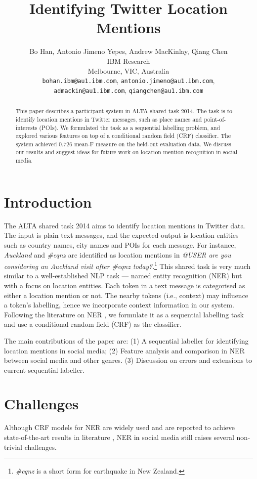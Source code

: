 \documentclass[11pt]{article}
\title{Identifying Twitter Location Mentions}
\author{Bo Han, Antonio Jimeno Yepes, Andrew MacKinlay, Qiang Chen \\
  IBM Research \\
  Melbourne, VIC, Australia \\
  {\tt bohan.ibm@au1.ibm.com}, {\tt antonio.jimeno@au1.ibm.com}, \\
  {\tt admackin@au1.ibm.com}, {\tt qiangchen@au1.ibm.com} 
  \\}
\date{}
\newcommand{\ie}{i.e.,\xspace}
\newcommand{\myex}[1]{\textit{#1}}
\begin{document}
\maketitle
\begin{abstract}
    This paper describes a participant system in ALTA shared task 2014.
    The task is to identify location mentions in Twitter messages, such as place names and point-of-interests (POIs).
    We formulated the task as a sequential labelling problem, and explored various features on top of a conditional random field (CRF) classifier.
    The system achieved 0.726 mean-F measure on the held-out evaluation data.
    We discuss our results and suggest ideas for future work on location mention recognition in social media.
\end{abstract}

\section{Introduction}
\label{sec:intro}
The ALTA shared task 2014 aims to identify location mentions in Twitter data.
The input is plain text messages, and the expected output is location entities such as country names, city names and POIs for each message.
For instance, \myex{Auckland} and \myex{\#eqnz} are identified as location mentions in \myex{@USER are you considering an Auckland visit after \#eqnz today?}.\footnote{\myex{\#eqnz} is a short form for earthquake in New Zealand.}
This shared task is very much similar to a well-established NLP task --- named entity recognition (NER) but with a focus on location entities.
Each token in a text message is categorised as either a location mention or not.
The nearby tokens (\ie context) may influence a token's labelling, hence we incorporate context information in our system.
Following the literature on NER \cite{wwwc13ling}, we formulate it as a sequential labelling task and use a conditional random field (CRF) as the classifier.

The main contributions of the paper are:
(1) A sequential labeller for identifying location mentions in social media;
(2) Feature analysis and comparison in NER between social media and other genres.
(3) Discussion on errors and extensions to current sequential labeller.

\section{Challenges}
\label{sec:challenge}
Although CRF models for NER are widely used and are reported to achieve state-of-the-art results in literature \cite{acl05fink,acl11liux,emnlp11ritt}, NER in social media still raises several non-trivial challenges.
\end{document}
